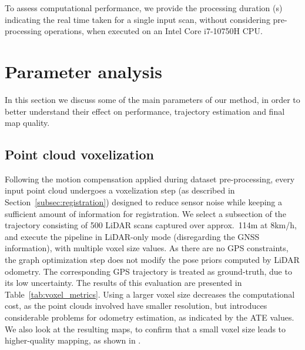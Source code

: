 To assess computational performance, we provide the processing duration (s) indicating the real time taken for a single input scan, without considering pre-processing operations, when executed on an Intel Core i7-10750H CPU.



\section{Parameter analysis}

In this section we discuss some of the main parameters of our method, in order to better understand their effect on performance, trajectory estimation and final map quality.
\subsection{Point cloud voxelization}
Following the motion compensation applied during dataset pre-processing, every input point cloud undergoes a voxelization step (as described in Section~\ref{subsec:registration}) designed to reduce sensor noise while keeping a sufficient amount of information for registration. We select a subsection of the trajectory consisting of 500 LiDAR scans captured over approx.~114m at 8km/h, and execute the pipeline in LiDAR-only mode (disregarding the GNSS information), with multiple voxel size values. As there are no GPS constraints, the graph optimization step does not modify the pose priors computed by LiDAR odometry. The corresponding GPS trajectory is treated as ground-truth, due to its low uncertainty. The results of this evaluation are presented in Table~\ref{tab:voxel_metrics}. Using a larger voxel size decreases the computational cost, as the point clouds involved have smaller resolution, but introduces considerable problems for odometry estimation, as indicated by the ATE values. We also look at the resulting maps, to confirm that a small voxel size leads to higher-quality mapping, as shown in .

